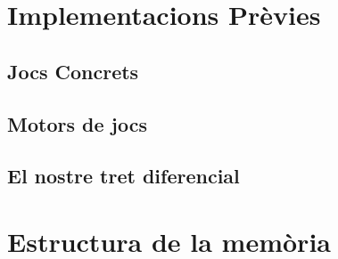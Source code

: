 \section{Implementacions Prèvies}

\subsection{Jocs Concrets}

\subsection{Motors de jocs}

\subsection{El nostre tret diferencial}

\section{Estructura de la memòria}